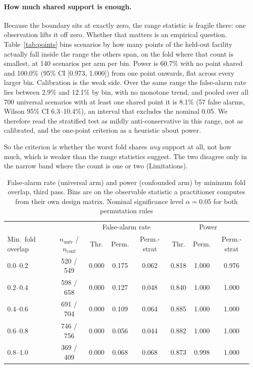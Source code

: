 \documentclass[journal=dce]{CUP-JNL-DTM}%
\begin{document}
\paragraph{How much shared support is enough.} Because the boundary sits at exactly zero, the range statistic is fragile there: one observation lifts it off zero. Whether that matters is an empirical question. Table~\ref{tab:points} bins scenarios by how many points of the held-out facility actually fall inside the range the others span, on the fold where that count is smallest, at 140 scenarios per arm per bin. Power is 60.7\% with no point shared and 100.0\% (95\% CI [0.973, 1.000]) from one point onwards, flat across every larger bin. Calibration is the weak side. Over the same range the false-alarm rate lies between 2.9\% and 12.1\% by bin, with no monotone trend, and pooled over all 700 universal scenarios with at least one shared point it is 8.1\% (57 false alarms, Wilson 95\% CI 6.3--10.4\%), an interval that excludes the nominal 0.05. We therefore read the stratified test as mildly anti-conservative in this range, not as calibrated, and the one-point criterion as a heuristic about power.

So the criterion is whether the worst fold shares \emph{any} support at all, not how much, which is weaker than the range statistics suggest. The two disagree only in the narrow band where the count is one or two (Limitations).

\begin{table}[htbp]
\centering
\caption{False-alarm rate (universal arm) and power (confounded arm) by minimum fold overlap, third pass. Bins are on the observable statistic a practitioner computes from their own design matrix. Nominal significance level $\alpha=0.05$ for both permutation rules}
\label{tab:overlap}
\small
\begin{tabular}{lcccc|ccc}
\toprule
 & & \multicolumn{3}{c|}{False-alarm rate} & \multicolumn{3}{c}{Power} \\
Min.\ fold overlap & $n_{\text{univ}}$ / $n_{\text{conf}}$ & Thr. & Perm. & Perm.-strat & Thr. & Perm. & Perm.-strat \\
\midrule
0.0--0.2 & 520 / 549 & 0.000 & 0.175 & 0.062 & 0.818 & 1.000 & 0.976 \\
0.2--0.4 & 598 / 658 & 0.000 & 0.127 & 0.048 & 0.840 & 1.000 & 1.000 \\
0.4--0.6 & 691 / 704 & 0.000 & 0.109 & 0.064 & 0.885 & 1.000 & 1.000 \\
0.6--0.8 & 746 / 756 & 0.000 & 0.056 & 0.044 & 0.882 & 1.000 & 1.000 \\
0.8--1.0 & 369 / 409 & 0.000 & 0.068 & 0.068 & 0.873 & 0.998 & 1.000 \\
\bottomrule
\end{tabular}
\end{table}
\end{document}
